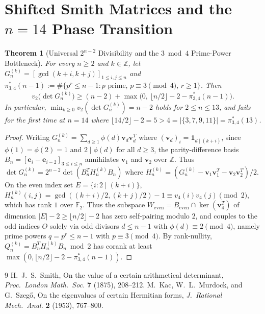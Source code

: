 \documentclass[12pt,reqno]{article}
\newtheorem{theorem}{Theorem}[section]
\begin{document}
\section{Shifted Smith Matrices and the $n=14$ Phase Transition}

\begin{theorem}[Universal $2^{n-2}$ Divisibility and the $3\bmod 4$ Prime-Power Bottleneck]\label{thm:shifted}
For every $n \ge 2$ and $k \in \mathbb{Z}$, let $G_n^{(k)} = [\gcd(k+i, k+j)]_{1\le i,j\le n}$ and $\pi_{3,4}^*(n-1) := \#\{p^r \le n-1 : p\text{ prime}, \, p \equiv 3 \pmod 4, \, r\ge 1\}$. Then
\begin{equation}
v_2\big(\det G_n^{(k)}\big) \ge (n - 2) + \max\Big(0, \, \lfloor n/2\rfloor - 2 - \pi_{3,4}^*(n-1)\Big).
\end{equation}
In particular, $\min_{k\ge 0} v_2(\det G_n^{(k)}) = n - 2$ holds for $2 \le n \le 13$, and fails for the first time at $n = 14$ where $\lfloor 14/2\rfloor - 2 = 5 > 4 = |\{3, 7, 9, 11\}| = \pi_{3,4}^*(13)$.
\end{theorem}
\begin{proof}
Writing $G_n^{(k)} = \sum_{d\ge 1} \phi(d)\mathbf{v}_d\mathbf{v}_d^T$ where $(\mathbf{v}_d)_i = \mathbf{1}_{d\mid (k+i)}$, since $\phi(1)=\phi(2)=1$ and $2\mid\phi(d)$ for all $d\ge 3$, the parity-difference basis $B_n = [\mathbf{e}_i - \mathbf{e}_{i-2}]_{3\le i\le n}$ annihilates $\mathbf{v}_1$ and $\mathbf{v}_2$ over $\mathbb{Z}$. Thus $\det G_n^{(k)} = 2^{n-2}\det(B_n^T H_n^{(k)} B_n)$ where $H_n^{(k)} = (G_n^{(k)} - \mathbf{v}_1\mathbf{v}_1^T - \mathbf{v}_2\mathbf{v}_2^T)/2$. On the even index set $E = \{i : 2\mid(k+i)\}$, $H_n^{(k)}(i,j) = \gcd((k+i)/2, (k+j)/2) - 1 \equiv v_4(i)v_4(j) \pmod 2$, which has rank $1$ over $\mathbb{F}_2$. Thus the subspace $W_{\text{even}} = B_{\text{even}} \cap \ker(\mathbf{v}_4^T)$ of dimension $|E|-2 \ge \lfloor n/2\rfloor - 2$ has zero self-pairing modulo $2$, and couples to the odd indices $O$ solely via odd divisors $d \le n-1$ with $\phi(d) \equiv 2 \pmod 4$, namely prime powers $q = p^r \le n-1$ with $p \equiv 3 \pmod 4$. By rank-nullity, $Q_n^{(k)} = B_n^T H_n^{(k)} B_n \bmod 2$ has corank at least $\max(0, \lfloor n/2\rfloor - 2 - \pi_{3,4}^*(n-1))$.
\end{proof}

\begin{thebibliography}{9}
 H.~J.~S.~Smith, On the value of a certain arithmetical determinant, \emph{Proc.\ London Math.\ Soc.} \textbf{7} (1875), 208--212.
 M.~Kac, W.~L.~Murdock, and G.~Szeg\H{o}, On the eigenvalues of certain Hermitian forms, \emph{J.\ Rational Mech.\ Anal.} \textbf{2} (1953), 767--800.
\end{thebibliography}
\end{document}
